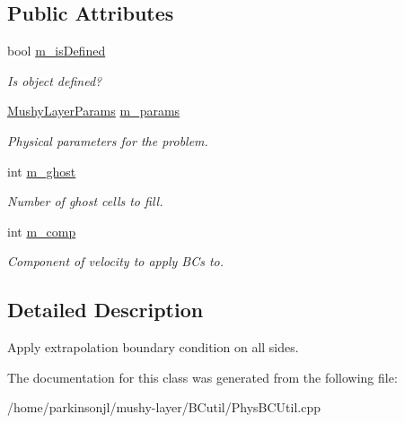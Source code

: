\subsection*{Public Attributes}
\begin{DoxyCompactItemize}
\item 
\hypertarget{class_basic_extrap_b_c_function_afedbf88ca74b82464859f699b0634dea}{bool \hyperlink{class_basic_extrap_b_c_function_afedbf88ca74b82464859f699b0634dea}{m\-\_\-is\-Defined}}\label{class_basic_extrap_b_c_function_afedbf88ca74b82464859f699b0634dea}

\begin{DoxyCompactList}\small\item\em Is object defined? \end{DoxyCompactList}\item 
\hypertarget{class_basic_extrap_b_c_function_a746a5c4527d9c8ad96dcbbe2fbc834b0}{\hyperlink{class_mushy_layer_params}{Mushy\-Layer\-Params} \hyperlink{class_basic_extrap_b_c_function_a746a5c4527d9c8ad96dcbbe2fbc834b0}{m\-\_\-params}}\label{class_basic_extrap_b_c_function_a746a5c4527d9c8ad96dcbbe2fbc834b0}

\begin{DoxyCompactList}\small\item\em Physical parameters for the problem. \end{DoxyCompactList}\item 
\hypertarget{class_basic_extrap_b_c_function_a14b9554c8baea2a9b215272daac1f183}{int \hyperlink{class_basic_extrap_b_c_function_a14b9554c8baea2a9b215272daac1f183}{m\-\_\-ghost}}\label{class_basic_extrap_b_c_function_a14b9554c8baea2a9b215272daac1f183}

\begin{DoxyCompactList}\small\item\em Number of ghost cells to fill. \end{DoxyCompactList}\item 
\hypertarget{class_basic_extrap_b_c_function_a00c04067887286a621897ebb7778fcb1}{int \hyperlink{class_basic_extrap_b_c_function_a00c04067887286a621897ebb7778fcb1}{m\-\_\-comp}}\label{class_basic_extrap_b_c_function_a00c04067887286a621897ebb7778fcb1}

\begin{DoxyCompactList}\small\item\em Component of velocity to apply B\-Cs to. \end{DoxyCompactList}\end{DoxyCompactItemize}


\subsection{Detailed Description}
Apply extrapolation boundary condition on all sides. 

The documentation for this class was generated from the following file\-:\begin{DoxyCompactItemize}
\item 
/home/parkinsonjl/mushy-\/layer/\-B\-Cutil/Phys\-B\-C\-Util.\-cpp\end{DoxyCompactItemize}
